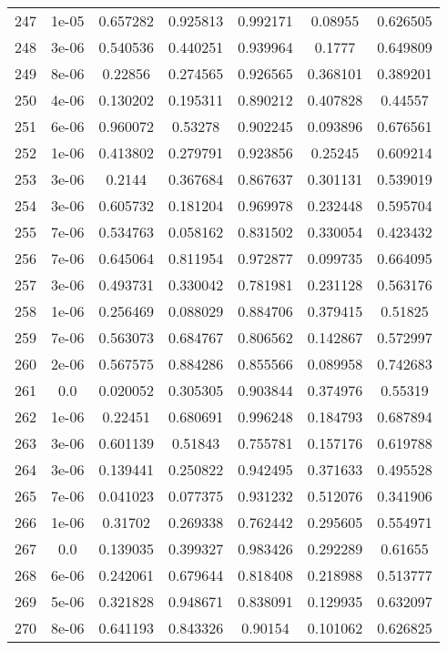 \begin{table}
\begin{tabular*}{\linewidth}{c|c|c|c|c|c|c}
247 & 1e-05 & 0.657282 & 0.925813 & 0.992171 & 0.08955 & 0.626505\\
248 & 3e-06 & 0.540536 & 0.440251 & 0.939964 & 0.1777 & 0.649809\\
249 & 8e-06 & 0.22856 & 0.274565 & 0.926565 & 0.368101 & 0.389201\\
250 & 4e-06 & 0.130202 & 0.195311 & 0.890212 & 0.407828 & 0.44557\\
251 & 6e-06 & 0.960072 & 0.53278 & 0.902245 & 0.093896 & 0.676561\\
252 & 1e-06 & 0.413802 & 0.279791 & 0.923856 & 0.25245 & 0.609214\\
253 & 3e-06 & 0.2144 & 0.367684 & 0.867637 & 0.301131 & 0.539019\\
254 & 3e-06 & 0.605732 & 0.181204 & 0.969978 & 0.232448 & 0.595704\\
255 & 7e-06 & 0.534763 & 0.058162 & 0.831502 & 0.330054 & 0.423432\\
256 & 7e-06 & 0.645064 & 0.811954 & 0.972877 & 0.099735 & 0.664095\\
257 & 3e-06 & 0.493731 & 0.330042 & 0.781981 & 0.231128 & 0.563176\\
258 & 1e-06 & 0.256469 & 0.088029 & 0.884706 & 0.379415 & 0.51825\\
259 & 7e-06 & 0.563073 & 0.684767 & 0.806562 & 0.142867 & 0.572997\\
260 & 2e-06 & 0.567575 & 0.884286 & 0.855566 & 0.089958 & 0.742683\\
261 & 0.0 & 0.020052 & 0.305305 & 0.903844 & 0.374976 & 0.55319\\
262 & 1e-06 & 0.22451 & 0.680691 & 0.996248 & 0.184793 & 0.687894\\
263 & 3e-06 & 0.601139 & 0.51843 & 0.755781 & 0.157176 & 0.619788\\
264 & 3e-06 & 0.139441 & 0.250822 & 0.942495 & 0.371633 & 0.495528\\
265 & 7e-06 & 0.041023 & 0.077375 & 0.931232 & 0.512076 & 0.341906\\
266 & 1e-06 & 0.31702 & 0.269338 & 0.762442 & 0.295605 & 0.554971\\
267 & 0.0 & 0.139035 & 0.399327 & 0.983426 & 0.292289 & 0.61655\\
268 & 6e-06 & 0.242061 & 0.679644 & 0.818408 & 0.218988 & 0.513777\\
269 & 5e-06 & 0.321828 & 0.948671 & 0.838091 & 0.129935 & 0.632097\\
270 & 8e-06 & 0.641193 & 0.843326 & 0.90154 & 0.101062 & 0.626825\\
\end{tabular*}
\end{table}
